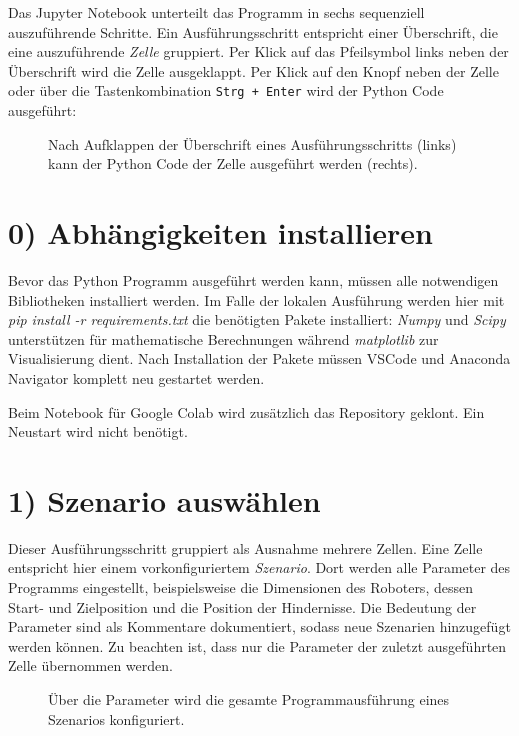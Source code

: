 Das Jupyter Notebook unterteilt das Programm in sechs sequenziell auszuführende Schritte. Ein Ausführungsschritt entspricht einer Überschrift, die eine auszuführende \textit{Zelle} gruppiert. Per Klick auf das Pfeilsymbol links neben der Überschrift wird die Zelle ausgeklappt. Per Klick auf den Knopf neben der Zelle oder über die Tastenkombination \texttt{Strg + Enter} wird der Python Code ausgeführt:
\begin{figure}[H]
	\centering
	\footnotesize
	\centerline{}
	\caption{Nach Aufklappen der Überschrift eines Ausführungsschritts (links) kann der Python Code der Zelle ausgeführt werden (rechts).}
\end{figure}

\section*{0) Abhängigkeiten installieren}
Bevor das Python Programm ausgeführt werden kann, müssen alle notwendigen Bibliotheken installiert werden. Im Falle der lokalen Ausführung werden hier mit \textit{pip install -r requirements.txt} die benötigten Pakete installiert: \textit{Numpy} und \textit{Scipy} unterstützen für mathematische Berechnungen während \textit{matplotlib} zur Visualisierung dient. Nach Installation der Pakete müssen VSCode und Anaconda Navigator komplett neu gestartet werden.

Beim Notebook für Google Colab wird zusätzlich das Repository geklont. Ein Neustart wird nicht benötigt.

\section*{1) Szenario auswählen}
Dieser Ausführungsschritt gruppiert als Ausnahme mehrere Zellen. Eine Zelle entspricht hier einem vorkonfiguriertem \textit{Szenario}. Dort werden alle Parameter des Programms eingestellt, beispielsweise die Dimensionen des Roboters, dessen Start- und Zielposition und die Position der Hindernisse.
Die Bedeutung der Parameter sind als Kommentare dokumentiert, sodass neue Szenarien hinzugefügt werden können. Zu beachten ist, dass nur die Parameter der zuletzt ausgeführten Zelle übernommen werden.
\begin{figure}[H]
	\centering
	\footnotesize
	\centerline{}
	\caption{Über die Parameter wird die gesamte Programmausführung eines Szenarios konfiguriert.}
\end{figure}

